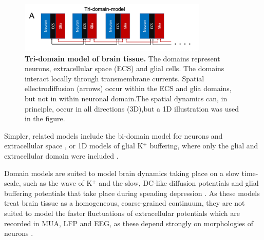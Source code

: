 \begin{figure}[!ht]
\begin{center}
\includegraphics[width=0.8\textwidth]{Figures/Schemes/Tridomain.png}
\end{center}
\caption{\textbf{Tri-domain model of brain tissue.} The domains represent neurons, extracellular space (ECS) and glial cells. The domains interact locally through transmembrane currents. Spatial ellectrodiffusion (arrows) occur within the ECS and glia domains, but not in within neuronal domain.The spatial dynamics can, in principle, occur in all directions (3D),but a 1D illustration was used in the figure. 
}
\label{Schemes:fig:domainmodel}
\end{figure}

Simpler, related models include the bi-domain model for neurons and extracellular space \citep{Mori2015}, or 1D models of glial K$^+$ buffering, where only the glial and extracellular domain were included \cite{Gardner-Medwin1983, Chen2000, Halnes2013}.

Domain models are suited to model brain dynamics taking place on a slow time-scale, such as the wave of K$^+$ and the slow, DC-like diffusion potentials and glial buffering potentials that take place during speading depression \citep{Mori2015, OConnell2016, tuttle2019}. As these models treat brain tissue as a homogeneous, coarse-grained continuum, they are not suited to model the faster fluctuations of extracellular potentials which are recorded in MUA, LFP and EEG, as these depend strongly on morphologies of neurons \citep{Einevoll2013}. 


